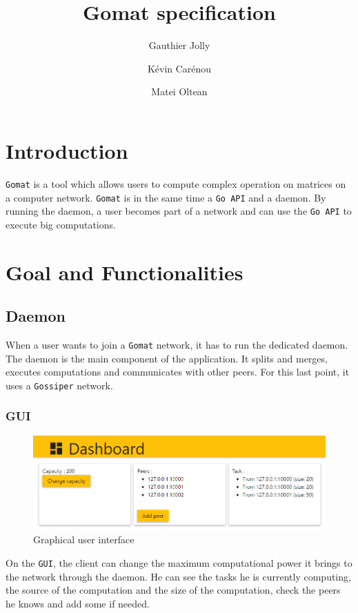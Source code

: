 \documentclass[a4paper,12pt]{article}
\title{Gomat specification}
\author{Gauthier Jolly \and K\'{e}vin Car\'{e}nou \and Matei Oltean}
\newcommand{\Gossiper}{\texttt{Gossiper}\xspace}
\newcommand{\Gomat}{\texttt{Gomat}\xspace}
\begin{document}
\maketitle
\tableofcontents
\newpage
    \section{Introduction}
    \Gomat is a tool which allows users to compute complex operation on matrices on a computer network.
    \Gomat is in the same time a \texttt{Go API} and a daemon. By running the daemon, a user becomes part of a network and can use the \texttt{Go API} to execute big computations.

    \section{Goal and Functionalities}
        \subsection{Daemon}
    When a user wants to join a \Gomat network, it has to run the dedicated daemon. The daemon is the main component of the application. It splits and merges, executes computations and communicates with other peers. For this last point, it uses a \Gossiper network.

        \subsubsection{GUI}
        \begin{figure}[!ht]
            \includegraphics[width=.95\textwidth]{gui.png}
            \caption{Graphical user interface}
            \label{glbView}
        \end{figure}
    On the \texttt{GUI}, the client can change the maximum computational power it brings to the network through the daemon. He can see the tasks he is currently computing, the source of the computation and the size of the computation, check the peers he knows and add some if needed.
\end{document}
